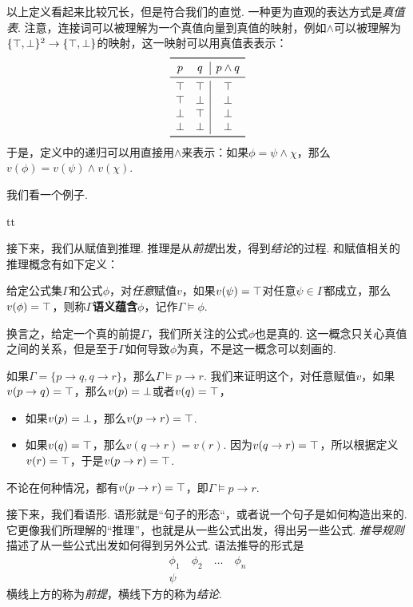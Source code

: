 以上定义看起来比较冗长，但是符合我们的直觉. 一种更为直观的表达方式是\textit{真值表}. 注意，连接词可以被理解为一个真值向量到真值的映射，例如$\wedge$可以被理解为$\{\top,\bot\}^2\to\{\top,\bot\}$的映射，这一映射可以用真值表表示：
\[
\begin{array}{cc|c}
    \toprule
    p & q & p\wedge q \\\midrule
    \T & \T & \T \\
    \T & \F & \F \\
    \F & \T & \F \\
    \F & \F & \F \\
    \bottomrule
\end{array}
\]
于是，定义中的递归可以用直接用$\wedge$来表示：如果$\phi=\psi\wedge\chi$，那么$v(\phi)=v(\psi)\wedge v(\chi)$.

我们看一个例子. 

\begin{example}
tt
\end{example}

接下来，我们从赋值到推理. 推理是从\textit{前提}出发，得到\textit{结论}的过程. 和赋值相关的推理概念有如下定义：

\begin{definition}[语义蕴含]
给定公式集$\Gamma$和公式$\phi$，对\textit{任意}赋值$v$，如果$v(\psi)=\top$对任意$\psi\in\Gamma$都成立，那么$v(\phi)=\top$，则称$\Gamma$\textbf{语义蕴含}$\phi$，记作$\Gamma\vDash\phi$.
\end{definition}

换言之，给定一个真的前提$\Gamma$，我们所关注的公式$\phi$也是真的. 这一概念只关心真值之间的关系，但是至于$\Gamma$如何导致$\phi$为真，不是这一概念可以刻画的. 

\begin{example}\label{ex:semantic-implication}
如果$\Gamma=\{p\to q,q\to r\}$，那么$\Gamma\vDash p\to r$. 我们来证明这个，对任意赋值$v$，如果$v(p\to q)=\top$，那么$v(p)=\bot$或者$v(q)=\top$，
\begin{itemize}
    \item 如果$v(p)=\bot$，那么$v(p\to r)=\top$.
    \item 如果$v(q)=\top$，那么$v(q\to r)=v(r)$. 因为$v(q\to r)=\top$，所以根据定义$v(r)=\top$，于是$v(p\to r)=\top$.
\end{itemize}
不论在何种情况，都有$v(p\to r)=\top$，即$\Gamma\vDash p\to r$.
\end{example}

接下来，我们看语形. 语形就是“句子的形态“，或者说一个句子是如何构造出来的. 它更像我们所理解的“推理”，也就是从一些公式出发，得出另一些公式. \textit{推导规则}描述了从一些公式出发如何得到另外公式. 语法推导的形式是
\[\begin{array}{c}
        \phi_1\quad\phi_2\quad\dots\quad\phi_n  \\\hline
        \psi
\end{array}\]
横线上方的称为\textit{前提}，横线下方的称为\textit{结论}. 

